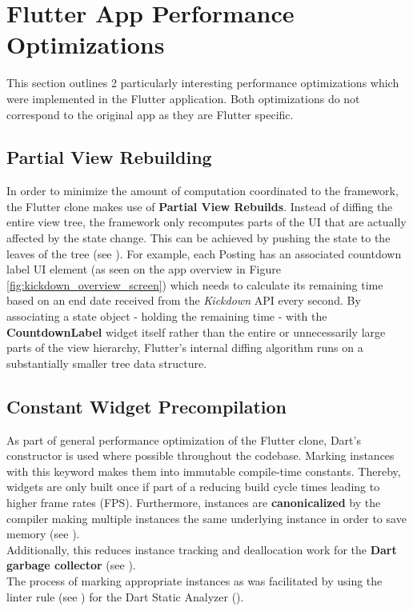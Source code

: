 \section{Flutter App Performance Optimizations}
This section outlines 2 particularly interesting performance optimizations which were implemented in the Flutter application. Both optimizations
do not correspond to the original app as they are Flutter specific.

\subsection{Partial View Rebuilding}
In order to minimize the amount of computation coordinated to the framework, the Flutter clone makes use of \textbf{Partial View Rebuilds}. 
Instead of diffing the entire view tree, the framework only recomputes parts of the UI that are actually affected by the state change. 
This can be achieved by pushing the state to the leaves of the tree (see \cite{StatefulWidgetPerformance2021}).
For example, each Posting has an associated countdown label UI element (as seen on the app overview in Figure \ref{fig:kickdown_overview_screen}) which needs to calculate its remaining time based on an end date received from the \textit{Kickdown} API every second.
By associating a state object - holding the remaining time - with the \textbf{CountdownLabel} widget itself rather than the entire or unnecessarily large parts of the view hierarchy, Flutter's internal diffing algorithm runs on a substantially smaller tree data structure.

\subsection{Constant Widget Precompilation} \label{section::constant_widget_precompilation}
As part of general performance optimization of the Flutter clone, Dart's  constructor is used where possible throughout the codebase.
Marking instances with this keyword makes them into immutable compile-time constants.
Thereby,  widgets are only built once if part of a  reducing build cycle times leading to higher frame rates (FPS).
Furthermore, instances are \textbf{canonicalized} by the compiler making multiple instances the same underlying instance in order to save memory (see \cite{DartConstDocumentation}).\\
Additionally, this reduces instance tracking and deallocation work for the \textbf{Dart garbage collector} (see \cite{DartGarbageCollector2021}).\\
The process of marking appropriate instances as  was facilitated by using the  linter rule (see \cite{ConstLinterRule2021}) for the Dart Static Analyzer (\cite{DartCodeAnalysis2021}). 

